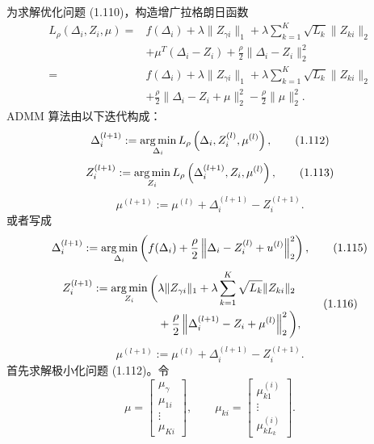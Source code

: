 为求解优化问题 (1.110)，构造增广拉格朗日函数
\begin{equation}
\begin{aligned}
L_\rho(\Delta_i,Z_i,\mu)
={}&f(\Delta_i)+\lambda\|Z_{\gamma i}\|_1
 +\lambda\sum_{k=1}^K\sqrt{L_k}\|Z_{ki}\|_2\\
&+\mu^T(\Delta_i-Z_i)+\frac{\rho}{2}\|\Delta_i-Z_i\|_2^2\\
={}&f(\Delta_i)+\lambda\|Z_{\gamma i}\|_1
 +\lambda\sum_{k=1}^K\sqrt{L_k}\|Z_{ki}\|_2\\
&+\frac{\rho}{2}\|\Delta_i-Z_i+\mu\|_2^2
 -\frac{\rho}{2}\|\mu\|_2^2.
\end{aligned}
\tag{1.111}
\end{equation}
ADMM 算法由以下迭代构成：
\begin{equation}
\Delta_i^{(l+1)}:=
\operatorname*{arg\,min}_{\Delta_i}L_\rho\left(\Delta_i,Z_i^{(l)},\mu^{(l)}\right),
\tag{1.112}
\end{equation}
\begin{equation}
Z_i^{(l+1)}:=
\operatorname*{arg\,min}_{Z_i}L_\rho\left(\Delta_i^{(l+1)},Z_i,\mu^{(l)}\right),
\tag{1.113}
\end{equation}
\begin{equation}
\mu^{(l+1)}:=\mu^{(l)}+\Delta_i^{(l+1)}-Z_i^{(l+1)}.
\tag{1.114}
\end{equation}
或者写成
\begin{equation}
\Delta_i^{(l+1)}:=
\operatorname*{arg\,min}_{\Delta_i}
\left(f(\Delta_i)+\frac{\rho}{2}
\left\|\Delta_i-Z_i^{(l)}+u^{(l)}\right\|_2^2\right),
\tag{1.115}
\end{equation}
\begin{equation}
\begin{aligned}
Z_i^{(l+1)}:=\operatorname*{arg\,min}_{Z_i}\bigg(&\lambda\|Z_{\gamma i}\|_1
 +\lambda\sum_{k=1}^K\sqrt{L_k}\|Z_{ki}\|_2\\
&+\frac{\rho}{2}
\left\|\Delta_i^{(l+1)}-Z_i+\mu^{(l)}\right\|_2^2\bigg),
\end{aligned}
\tag{1.116}
\end{equation}
\begin{equation}
\mu^{(l+1)}:=\mu^{(l)}+\Delta_i^{(l+1)}-Z_i^{(l+1)}.
\tag{1.117}
\end{equation}
首先求解极小化问题 (1.112)。令
\[
\mu=\begin{bmatrix}\mu_\gamma\\\mu_{1i}\\\vdots\\\mu_{Ki}\end{bmatrix},
\qquad
\mu_{ki}=\begin{bmatrix}\mu_{k1}^{(i)}\\\vdots\\\mu_{kL_k}^{(i)}\end{bmatrix}.
\]
